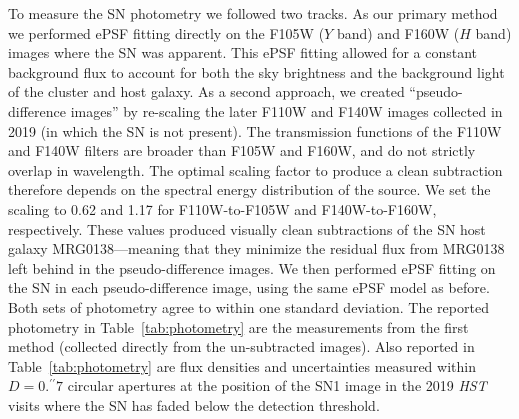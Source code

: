 \documentclass[12pt]{article}
\begin{document}
To measure the SN photometry we followed two tracks.  As our primary method we performed ePSF fitting directly on the F105W ($Y$ band) and F160W ($H$ band) images where the SN was apparent.  This ePSF fitting allowed for a constant background flux to account for both the sky brightness and the background light of the cluster and host galaxy.  
As a second approach, we created ``pseudo-difference images'' by re-scaling the later F110W and F140W images collected in 2019 (in which the SN is not present).  The transmission functions of the F110W and F140W filters are broader than F105W and F160W, and do not strictly overlap in wavelength.  The optimal scaling factor to produce a clean subtraction therefore depends on the spectral energy distribution of the source.  We set the scaling to 0.62 and 1.17 for F110W-to-F105W and F140W-to-F160W, respectively.  These values produced visually clean subtractions of the SN host galaxy MRG0138---meaning that they minimize the residual flux from MRG0138 left behind in the pseudo-difference images.  We then performed ePSF fitting on the SN in each pseudo-difference image, using the same ePSF model as before.   Both sets of photometry agree to within one standard deviation.  The reported photometry in Table~\ref{tab:photometry} are the measurements from the first method (collected directly from the un-subtracted images).  Also reported in Table~\ref{tab:photometry} are flux densities and uncertainties measured within $D=0.^{\prime\prime}7$ circular apertures at the position of the SN1 image in the 2019 \textit{HST} visits where the SN has faded below the detection threshold.
\end{document}
